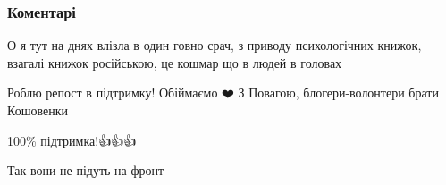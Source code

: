  
 
 
 
 
\subsubsection{Коментарі}
\label{sec:30_07_2021.fb.bielskaja_elizaveta.1.ros_kentavry.cmt}

\begin{itemize}
 
О я тут на днях влізла в один говно срач, з приводу психологічних книжок, взагалі книжок російською, це кошмар що в людей в головах 😤

 
Роблю репост в підтримку! Обіймаємо ❤️ З Повагою, блогери-волонтери брати Кошовенки 🔱🇺🇦

 
100\% підтримка!👍👍👍

 
Так вони не підуть на фронт

 


\end{itemize}
